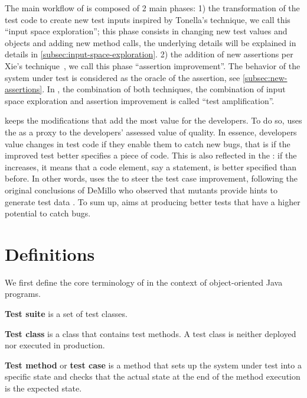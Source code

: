 The main workflow of \dspot{} is composed of 2 main phases:
1) the transformation of the test code to create new test inputs inspired by Tonella's technique, we call this ``input space exploration''; this phase consists in changing new test values and objects and adding new method calls, the underlying details will be explained in details in \autoref{subsec:input-space-exploration}.
2) the addition of new assertions per Xie's technique~\cite{TaoXie2006}, we call this phase ``assertion improvement''. The behavior of the system under test is considered as the oracle of the assertion, see \autoref{subsec:new-assertions}.
In \dspot, the combination of both techniques, \ie the combination of input space exploration and assertion improvement is called ``test amplification''.

\dspot keeps the modifications that add the most value for the developers.
To do so, \dspot uses the \ms as a proxy to the developers' assessed value of quality.
In essence, developers value changes in test code if they enable them to catch new bugs, that is if the improved test better specifies a piece of code.
This is also reflected in the \ms: if the \ms increases, it means that a code element, say a statement, is better specified than before. 
In other words, \dspot uses the \ms to steer the test case improvement, following the original conclusions of DeMillo \etal who observed that mutants provide hints to generate test data \cite{demillo1978hints}.
To sum up, \dspot aims at producing better tests that have a higher potential to catch bugs.




\section{Definitions}

We first define the core terminology of \dspot in the context of object-oriented Java programs. 

\textbf{Test suite} is a set of test classes.

\textbf{Test class} is a class that contains test methods. A test class is neither deployed nor executed in production.

\textbf{Test method} or \textbf{test case} is a method that sets up the system under test into a specific state and checks that the actual state at the end of the method execution is the expected state.

